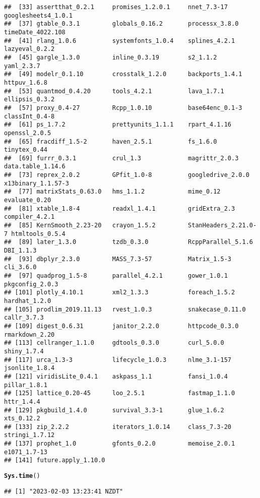 \documentclass{article}\usepackage[]{graphicx}\usepackage[]{xcolor}
\makeatletter
\newcommand{\hlstd}[1]{\textcolor[rgb]{0.345,0.345,0.345}{#1}}%
\newcommand{\hlkwd}[1]{\textcolor[rgb]{0.737,0.353,0.396}{\textbf{#1}}}%
\newenvironment{kframe}{%
 \def\at@end@of@kframe{}%
 \ifinner\ifhmode%
  \def\at@end@of@kframe{\end{minipage}}%
  \begin{minipage}{\columnwidth}%
 \fi\fi%
 \def\FrameCommand##1{\hskip\@totalleftmargin \hskip-\fboxsep
 \colorbox{shadecolor}{##1}\hskip-\fboxsep
     \hskip-\linewidth \hskip-\@totalleftmargin \hskip\columnwidth}%
 \MakeFramed {\advance\hsize-\width
   \@totalleftmargin\z@ \linewidth\hsize
   \@setminipage}}%
 {\par\unskip\endMakeFramed%
 \at@end@of@kframe}
\newenvironment{knitrout}{}{} %
\makeatother
\begin{document}
\begin{knitrout}
\begin{kframe}
\begin{verbatim}
##  [33] assertthat_0.2.1     promises_1.2.0.1     nnet_7.3-17          googlesheets4_1.0.1 
##  [37] gtable_0.3.1         globals_0.16.2       processx_3.8.0       timeDate_4022.108   
##  [41] rlang_1.0.6          systemfonts_1.0.4    splines_4.2.1        lazyeval_0.2.2      
##  [45] gargle_1.3.0         inline_0.3.19        s2_1.1.2             yaml_2.3.7          
##  [49] modelr_0.1.10        crosstalk_1.2.0      backports_1.4.1      httpuv_1.6.8        
##  [53] quantmod_0.4.20      tools_4.2.1          lava_1.7.1           ellipsis_0.3.2      
##  [57] proxy_0.4-27         Rcpp_1.0.10          base64enc_0.1-3      classInt_0.4-8      
##  [61] ps_1.7.2             prettyunits_1.1.1    rpart_4.1.16         openssl_2.0.5       
##  [65] fracdiff_1.5-2       haven_2.5.1          fs_1.6.0             tinytex_0.44        
##  [69] furrr_0.3.1          crul_1.3             magrittr_2.0.3       data.table_1.14.6   
##  [73] reprex_2.0.2         GPfit_1.0-8          googledrive_2.0.0    x13binary_1.1.57-3  
##  [77] matrixStats_0.63.0   hms_1.1.2            mime_0.12            evaluate_0.20       
##  [81] xtable_1.8-4         readxl_1.4.1         gridExtra_2.3        compiler_4.2.1      
##  [85] KernSmooth_2.23-20   crayon_1.5.2         StanHeaders_2.21.0-7 htmltools_0.5.4     
##  [89] later_1.3.0          tzdb_0.3.0           RcppParallel_5.1.6   DBI_1.1.3           
##  [93] dbplyr_2.3.0         MASS_7.3-57          Matrix_1.5-3         cli_3.6.0           
##  [97] quadprog_1.5-8       parallel_4.2.1       gower_1.0.1          pkgconfig_2.0.3     
## [101] plotly_4.10.1        xml2_1.3.3           foreach_1.5.2        hardhat_1.2.0       
## [105] prodlim_2019.11.13   rvest_1.0.3          snakecase_0.11.0     callr_3.7.3         
## [109] digest_0.6.31        janitor_2.2.0        httpcode_0.3.0       rmarkdown_2.20      
## [113] cellranger_1.1.0     gdtools_0.3.0        curl_5.0.0           shiny_1.7.4         
## [117] urca_1.3-3           lifecycle_1.0.3      nlme_3.1-157         jsonlite_1.8.4      
## [121] viridisLite_0.4.1    askpass_1.1          fansi_1.0.4          pillar_1.8.1        
## [125] lattice_0.20-45      loo_2.5.1            fastmap_1.1.0        httr_1.4.4          
## [129] pkgbuild_1.4.0       survival_3.3-1       glue_1.6.2           xts_0.12.2          
## [133] zip_2.2.2            iterators_1.0.14     class_7.3-20         stringi_1.7.12      
## [137] prophet_1.0          gfonts_0.2.0         memoise_2.0.1        e1071_1.7-13        
## [141] future.apply_1.10.0
\end{verbatim}
\begin{alltt}
\hlkwd{Sys.time}\hlstd{()}
\end{alltt}
\begin{verbatim}
## [1] "2023-02-03 13:23:41 NZDT"
\end{verbatim}
\end{kframe}
\end{knitrout}
\end{document}
